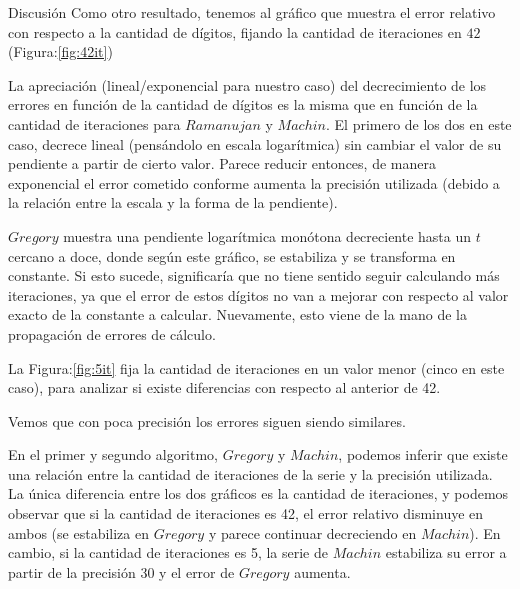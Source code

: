 \begin{section}{Discusión}
	Como otro resultado, tenemos al gráfico que muestra el error relativo con respecto a la cantidad de dígitos, fijando la cantidad de iteraciones en $42$ (Figura:\ref{fig:42it})
	
	La apreciación (lineal/exponencial para nuestro caso) del decrecimiento de los errores en función de la cantidad de dígitos es la misma que en función de la cantidad de iteraciones para $Ramanujan$ y $Machin$. El primero de los dos en este caso, decrece lineal (pensándolo en escala logarítmica) sin cambiar el valor de su pendiente a partir de cierto valor. Parece reducir entonces, de manera exponencial el error cometido conforme aumenta la precisión utilizada (debido a la relación entre la escala y la forma de la pendiente).
	
	$Gregory$ muestra una pendiente logarítmica monótona decreciente hasta un $t$ cercano a doce, donde según este gráfico, se estabiliza y se transforma en constante. Si esto sucede, significaría que no tiene sentido seguir calculando más iteraciones, ya que el error de estos dígitos no van a mejorar con respecto al valor exacto de la constante a calcular. Nuevamente, esto viene de la mano de la propagación de errores de cálculo.
	
	La Figura:\ref{fig:5it} fija la cantidad de iteraciones en un valor menor (cinco en este caso), para analizar si existe diferencias con respecto al anterior de 42.
	
	Vemos que con poca precisión los errores siguen siendo similares.
	
	
	En el primer y segundo algoritmo, $Gregory$ y $Machin$, podemos inferir que existe una relación entre la cantidad de iteraciones de la serie y la precisión utilizada. La única diferencia entre los dos gráficos es la cantidad de iteraciones, y podemos observar que si la cantidad de iteraciones es 42, el error relativo disminuye en ambos (se estabiliza en $Gregory$ y parece continuar decreciendo en $Machin$). En cambio, si la cantidad de iteraciones es 5, la serie de $Machin$ estabiliza su error a partir de la precisión 30 y el error de $Gregory$ aumenta. \\
	

\end{section}
